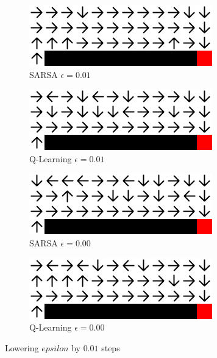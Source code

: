 \documentclass{article}
\begin{document}
\begin{figure}
    \begin{subfigure}{.5\textwidth}
        \centering
        \includegraphics[width=.8\linewidth]{imgs/sarsa_epsilon_0.01.png}
        \caption{SARSA $\epsilon=0.01$}
    \end{subfigure}
    \begin{subfigure}{.5\textwidth}
        \centering
        \includegraphics[width=.8\linewidth]{imgs/qlearning_epsilon_0.01.png}
        \caption{Q-Learning $\epsilon=0.01$}
    \end{subfigure}

    \begin{subfigure}{.5\textwidth}
        \centering
        \includegraphics[width=.8\linewidth]{imgs/sarsa_epsilon_0.00.png}
        \caption{SARSA $\epsilon=0.00$}
    \end{subfigure}
    \begin{subfigure}{.5\textwidth}
        \centering
        \includegraphics[width=.8\linewidth]{imgs/qlearning_epsilon_0.00.png}
        \caption{Q-Learning $\epsilon=0.00$}
    \end{subfigure}

    \caption{Lowering $epsilon$ by $0.01$ steps}
\end{figure}
\end{document}

